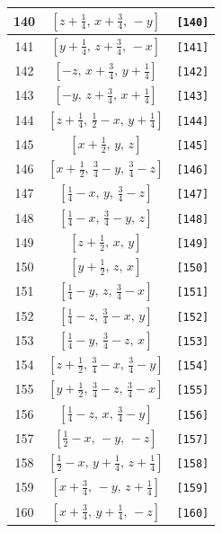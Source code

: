 \documentclass[fleqn,8pt]{jsarticle}
\begin{document}
\begin{longtable}{ccc}
140 & $\left[ z + \frac{1}{4},\, x + \frac{3}{4},\, - y \right]$ & {\tt [140]} \\ \hline
141 & $\left[ y + \frac{1}{4},\, z + \frac{3}{4},\, - x \right]$ & {\tt [141]} \\ \hline
142 & $\left[ - z,\, x + \frac{3}{4},\, y + \frac{1}{4} \right]$ & {\tt [142]} \\ \hline
143 & $\left[ - y,\, z + \frac{3}{4},\, x + \frac{1}{4} \right]$ & {\tt [143]} \\ \hline
144 & $\left[ z + \frac{1}{4},\, \frac{1}{2} - x,\, y + \frac{1}{4} \right]$ & {\tt [144]} \\ \hline
145 & $\left[ x + \frac{1}{2},\, y,\, z \right]$ & {\tt [145]} \\ \hline
146 & $\left[ x + \frac{1}{2},\, \frac{3}{4} - y,\, \frac{3}{4} - z \right]$ & {\tt [146]} \\ \hline
147 & $\left[ \frac{1}{4} - x,\, y,\, \frac{3}{4} - z \right]$ & {\tt [147]} \\ \hline
148 & $\left[ \frac{1}{4} - x,\, \frac{3}{4} - y,\, z \right]$ & {\tt [148]} \\ \hline
149 & $\left[ z + \frac{1}{2},\, x,\, y \right]$ & {\tt [149]} \\ \hline
150 & $\left[ y + \frac{1}{2},\, z,\, x \right]$ & {\tt [150]} \\ \hline
151 & $\left[ \frac{1}{4} - y,\, z,\, \frac{3}{4} - x \right]$ & {\tt [151]} \\ \hline
152 & $\left[ \frac{1}{4} - z,\, \frac{3}{4} - x,\, y \right]$ & {\tt [152]} \\ \hline
153 & $\left[ \frac{1}{4} - y,\, \frac{3}{4} - z,\, x \right]$ & {\tt [153]} \\ \hline
154 & $\left[ z + \frac{1}{2},\, \frac{3}{4} - x,\, \frac{3}{4} - y \right]$ & {\tt [154]} \\ \hline
155 & $\left[ y + \frac{1}{2},\, \frac{3}{4} - z,\, \frac{3}{4} - x \right]$ & {\tt [155]} \\ \hline
156 & $\left[ \frac{1}{4} - z,\, x,\, \frac{3}{4} - y \right]$ & {\tt [156]} \\ \hline
157 & $\left[ \frac{1}{2} - x,\, - y,\, - z \right]$ & {\tt [157]} \\ \hline
158 & $\left[ \frac{1}{2} - x,\, y + \frac{1}{4},\, z + \frac{1}{4} \right]$ & {\tt [158]} \\ \hline
159 & $\left[ x + \frac{3}{4},\, - y,\, z + \frac{1}{4} \right]$ & {\tt [159]} \\ \hline
160 & $\left[ x + \frac{3}{4},\, y + \frac{1}{4},\, - z \right]$ & {\tt [160]} \\ \hline

\end{longtable}
\end{document}
